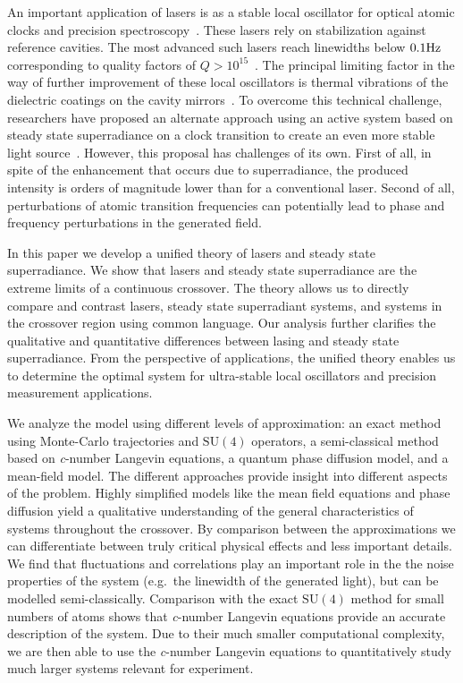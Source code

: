 \documentclass[aps,
twocolumn,
showpacs,
superscriptaddress,groupedaddress]{revtex4}
\begin{document}
An important application of lasers is as a stable local oscillator for
optical atomic clocks and precision
spectroscopy~\cite{RevModPhys.87.637}.  These lasers rely on
stabilization against reference cavities.  The most advanced such
lasers reach linewidths below $0.1 {\rm Hz}$ corresponding to quality
factors of $Q>10^{15}$~\cite{Cole:TenfoldReductionBrownianNoise}. The
principal limiting factor in the way of further improvement of these
local oscillators is thermal vibrations of the dielectric coatings on
the cavity mirrors~\cite{PhysRevLett.101.260602}.  To overcome this
technical challenge, researchers have proposed an alternate approach
using an active system based on steady state superradiance on a clock
transition to create an even more stable light
source~\cite{PhysRevLett.102.163601, ChenDeliciousLaser}.  However,
this proposal has challenges of its own.  First of all, in spite of
the enhancement that occurs due to superradiance, the produced
intensity is orders of magnitude lower than for a conventional laser.
Second of all, perturbations of atomic transition frequencies can
potentially lead to phase and frequency perturbations in the generated
field.

In this paper we develop a unified theory of lasers and steady state
superradiance.  We show that lasers and steady state superradiance are
the extreme limits of a continuous crossover.  The theory allows us to
directly compare and contrast lasers, steady state superradiant
systems, and systems in the crossover region using common language.
Our analysis further clarifies the qualitative and quantitative
differences between lasing and steady state superradiance.  From the
perspective of applications, the unified theory enables us to
determine the optimal system for ultra-stable local oscillators and
precision measurement applications.

We analyze the model using different levels of approximation: an exact
method using Monte-Carlo trajectories and $\mathrm{SU}(4)$ operators, a
semi-classical method based on \textit{c}-number Langevin equations, a
quantum phase diffusion model, and a mean-field model.  The different
approaches provide insight into different aspects of the problem.
Highly simplified models like the mean field equations and phase
diffusion yield a qualitative understanding of the general
characteristics of systems throughout the crossover.  By comparison
between the approximations we can differentiate between truly critical
physical effects and less important details.  We find that fluctuations
and correlations play an important role in the the noise properties of
the system (e.g.\ the linewidth of the generated light), but can be
modelled semi-classically.  Comparison with the exact $\mathrm{SU}(4)$
method for small numbers of atoms shows that \textit{c}-number Langevin
equations provide an accurate description of the system.  Due to their
much smaller computational complexity, we are then able to use the
\textit{c}-number Langevin equations to quantitatively study much larger
systems relevant for experiment.
\end{document}
